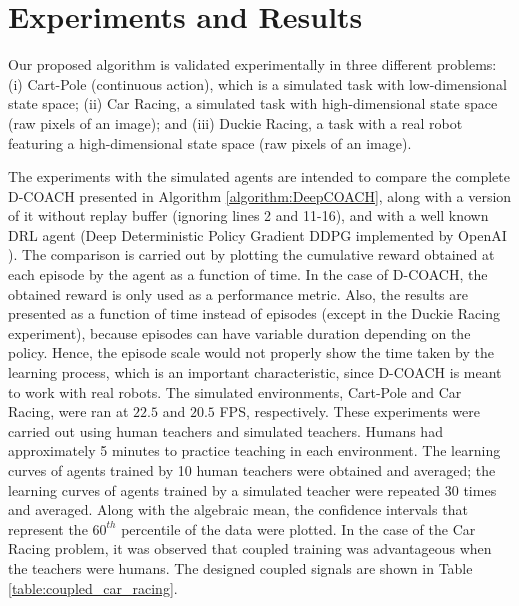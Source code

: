 \section{Experiments and Results}

Our proposed algorithm is validated experimentally in three different problems: (i) Cart-Pole (continuous action), which is a simulated task with low-dimensional state space; (ii) Car Racing, a simulated task with high-dimensional state space (raw pixels of an image); and (iii) Duckie Racing, a task with a real robot featuring a high-dimensional state space (raw pixels of an image). 

The experiments with the simulated agents are intended to compare the complete D-COACH presented in Algorithm \ref{algorithm:DeepCOACH}, along with a version of it without replay buffer (ignoring lines 2 and 11-16), and with a well known DRL agent (Deep Deterministic Policy Gradient DDPG \cite{Lillicrap2015} implemented by OpenAI \cite{baselines}). The comparison is carried out by plotting the cumulative reward obtained at each episode by the agent as a function of time. In the case of D-COACH, the obtained reward is only used as a performance metric. Also, the results are presented as a function of time instead of episodes (except in the Duckie Racing experiment), because episodes can have variable duration depending on the policy. Hence, the episode scale would not properly show the time taken by the learning process, which is an important characteristic, since D-COACH is meant to work with real robots. The simulated environments, Cart-Pole and Car Racing, were ran at $22.5$ and $20.5$ FPS, respectively. These experiments were carried out using human teachers and simulated teachers. Humans had approximately 5 minutes to practice teaching in each environment. The learning curves of agents trained by 10 human teachers were obtained and averaged; the learning curves of agents trained by a simulated teacher were repeated 30 times and averaged. Along with the algebraic mean, the confidence intervals that represent the $60^{th}$ percentile of the data were plotted. In the case of the Car Racing problem, it was observed that coupled training was advantageous when the teachers were humans. The designed coupled signals are shown in Table \ref{table:coupled_car_racing}.

